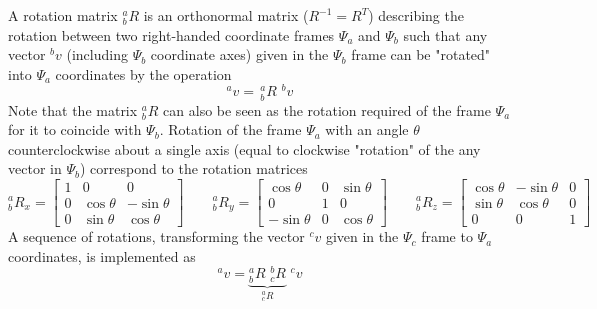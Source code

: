 A rotation matrix $^a_bR$ is an orthonormal matrix ($R^{-1}=R^T$) describing the rotation between two right-handed coordinate frames $\Psi_a$ and $\Psi_b$ such that any vector $^bv$ (including $\Psi_b$ coordinate axes) given in the $\Psi_b$ frame can be "rotated" into $\Psi_a$ coordinates by the operation
\begin{equation}
^av =\, ^a_bR \,\,^bv
\end{equation}
Note that the matrix $^a_bR$ can also be seen as the rotation required of the frame $\Psi_a$ for it to coincide with $\Psi_b$.
Rotation of the frame $\Psi_a$ with an angle $\theta$ counterclockwise about a single axis (equal to clockwise "rotation" of the any vector in $\Psi_b$) correspond to the rotation matrices
\begin{equation}
^a_bR_x = 
\begin{bmatrix}
1 & 0 & 0\\
0 & \cos\theta & -\sin\theta\\
0 & \sin\theta & \cos\theta
\end{bmatrix} 
\qquad
^a_bR_y = 
\begin{bmatrix}
\cos\theta & 0 & \sin\theta \\
0 & 1 & 0\\
-\sin\theta & 0 & \cos\theta
\end{bmatrix}
\qquad
^a_bR_z = 
\begin{bmatrix}
\cos\theta & -\sin\theta & 0\\
\sin\theta & \cos\theta & 0\\
0 & 0 & 1
\end{bmatrix}
\end{equation}
A sequence of rotations, transforming the vector $^cv$ given in the $\Psi_c$ frame to $\Psi_a$ coordinates, is implemented as
\begin{equation}
^av = \underbrace{^a_bR \,\, ^b_cR}_{^a_cR} \,\,^cv 
\end{equation}

